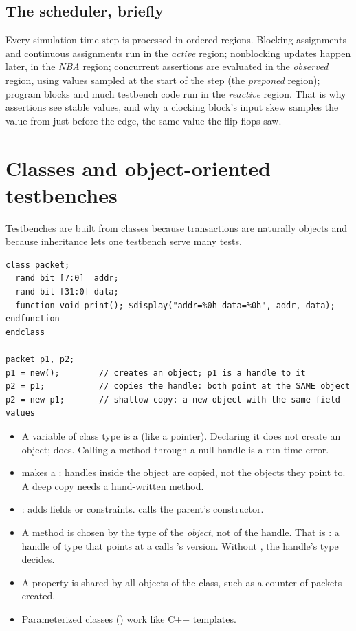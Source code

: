 \subsection*{The scheduler, briefly}

Every simulation time step is processed in ordered regions. Blocking assignments and continuous assignments run in the \emph{active} region; nonblocking updates happen later, in the \emph{NBA} region; concurrent assertions are evaluated in the \emph{observed} region, using values sampled at the start of the step (the \emph{preponed} region); program blocks and much testbench code run in the \emph{reactive} region. That is why assertions see stable values, and why a clocking block's  input skew samples the value from just before the edge, the same value the flip-flops saw.

\section{Classes and object-oriented testbenches}

Testbenches are built from classes because transactions are naturally objects and because inheritance lets one testbench serve many tests.

\begin{lstlisting}
class packet;
  rand bit [7:0]  addr;
  rand bit [31:0] data;
  function void print(); $display("addr=%0h data=%0h", addr, data); endfunction
endclass

packet p1, p2;
p1 = new();        // creates an object; p1 is a handle to it
p2 = p1;           // copies the handle: both point at the SAME object
p2 = new p1;       // shallow copy: a new object with the same field values
\end{lstlisting}

\begin{itemize}
  \item A variable of class type is a  (like a pointer). Declaring it does not create an object;  does. Calling a method through a null handle is a run-time error.
  \item {} makes a : handles inside the object are copied, not the objects they point to. A deep copy needs a hand-written  method.
  \item {}:  adds fields or constraints.  calls the parent's constructor.
  \item A  method is chosen by the type of the \emph{object}, not of the handle. That is : a handle of type  that points at a  calls 's version. Without , the handle's type decides.
  \item A  property is shared by all objects of the class, such as a counter of packets created.
  \item Parameterized classes () work like C++ templates.
\end{itemize}

